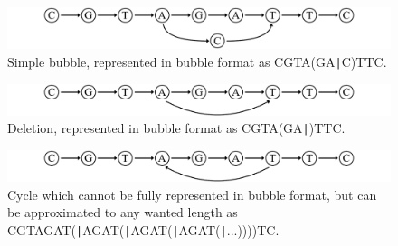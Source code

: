 \documentclass[a4paper,12pt,twoside,BCOR=10mm]{scrbook}
\def\pipe{\texttt{|}}
\begin{document}
\begin{figure}[!htb]
\centering
\includegraphics[width=\textwidth]{evo_fig_STPUbubble_f.pdf}
\caption[Simple bubble in bubble format]{Simple bubble, represented in bubble format as \textup{CGTA(GA\pipe C)TTC}.} \label{fig:evo_fig_STPUbubble_f}
\end{figure}
\begin{figure}[!htb]
\centering
\includegraphics[width=\textwidth]{evo_fig_STPUinsertion_f.pdf}
\caption[Deletion in bubble format]{Deletion, represented in bubble format as \textup{CGTA(GA\pipe )TTC}.} \label{fig:evo_fig_STPUinsertion_f}
\end{figure}
\begin{figure}[!htb]
\centering
\includegraphics[width=\textwidth]{evo_fig_STPUcycle_f.pdf}
\caption[Cycle in bubble format]{Cycle which cannot be fully represented in bubble format, but can be approximated to any wanted length as \textup{CGTAGAT(\pipe AGAT(\pipe AGAT(\pipe AGAT(\pipe ...))))TC}.} \label{fig:evo_fig_STPUcycle_f}
\end{figure}
\end{document}
